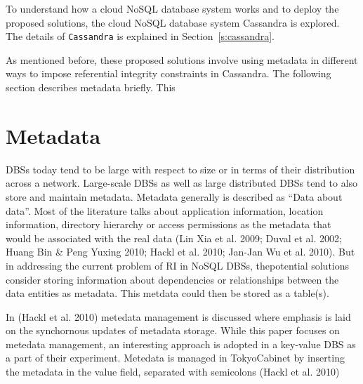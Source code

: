 To understand how a cloud \ac{NoSQL} database system works and to deploy
the proposed solutions, the cloud \ac{NoSQL} database system Cassandra
is explored. The details of \texttt{Cassandra} is explained in
Section~\ref{s:cassandra}.

% 


As mentioned before, these proposed solutions involve using metadata in
different ways to impose referential integrity constraints in Cassandra. The
following section describes metadata briefly. This 


\section{Metadata}\label{s:metadata}
DBSs today tend to be large with respect to size or in terms of their
distribution across a network. Large-scale DBSs as well as large distributed
DBSs tend to also store and maintain metadata. Metadata generally is described
as ``Data about data''. Most of the literature talks about application
information, location information, directory hierarchy or access permissions as
the metadata that would be associated with the real data (Lin Xia et al. 2009;
Duval et al. 2002; Huang Bin \& Peng Yuxing 2010; Hackl et al. 2010; Jan-Jan Wu
et al. 2010). But in addressing the current problem of RI in NoSQL DBSs,
thepotential solutions consider storing information about dependencies or
relationships between the data entities as metadata. This metdata could then be
stored as a table(s).

In (Hackl et al. 2010) metedata management is discussed where emphasis is laid
on the synchornous updates of metadata storage. While this paper focuses on
metedata management, an interesting approach is adopted in a key-value DBS as a
part of their experiment. Metedata is managed in TokyoCabinet by inserting the
metadata in the value field, separated with semicolons (Hackl et al. 2010)

